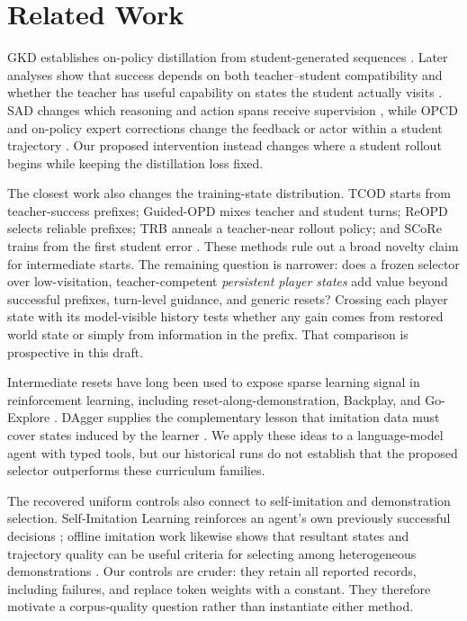 \documentclass[11pt,a4paper]{article}
\begin{document}
\section{Related Work}

GKD establishes on-policy distillation from student-generated sequences
\citep{agarwal2024gkd}. Later analyses show that success depends on both
teacher--student compatibility and whether the teacher has useful capability on
states the student actually visits \citep{li2026rethinking}. SAD changes which
reasoning and action spans receive supervision \citep{liu2026sad}, while OPCD
and on-policy expert corrections change the feedback or actor within a student
trajectory \citep{ye2026opcd,lauffer2025oec}. Our proposed intervention instead
changes where a student rollout begins while keeping the distillation loss
fixed.

The closest work also changes the training-state distribution. TCOD starts from
teacher-success prefixes; Guided-OPD mixes teacher and student turns; ReOPD
selects reliable prefixes; TRB anneals a teacher-near rollout policy; and SCoRe
trains from the first student error
\citep{wang2026tcod,li2026guidedopd,liao2026reopd,plyusov2026trb,lyu2025score}.
These methods rule out a broad novelty claim for intermediate starts. The
remaining question is narrower: does a frozen selector over low-visitation,
teacher-competent \emph{persistent player states} add value beyond successful
prefixes, turn-level guidance, and generic resets? Crossing each player state
with its model-visible history tests whether any gain comes from restored world
state or simply from information in the prefix. That comparison is prospective
in this draft.

Intermediate resets have long been used to expose sparse learning signal in
reinforcement learning, including reset-along-demonstration, Backplay, and
Go-Explore
\citep{salimans2018montezuma,resnick2018backplay,ecoffet2021goexplore}.
DAgger supplies the complementary lesson that imitation data must cover states
induced by the learner \citep{ross2011dagger}. We apply these ideas to a
language-model agent with typed tools, but our historical runs do not establish
that the proposed selector outperforms these curriculum families.

The recovered uniform controls also connect to self-imitation and
demonstration selection. Self-Imitation Learning reinforces an agent's own
previously successful decisions \citep{oh2018selfimitation}; offline imitation
work likewise shows that resultant states and trajectory quality can be useful
criteria for selecting among heterogeneous demonstrations
\citep{yue2024diverse}. Our controls are cruder: they retain all reported
records, including failures, and replace token weights with a constant. They
therefore motivate a corpus-quality question rather than instantiate either
method.
\end{document}

